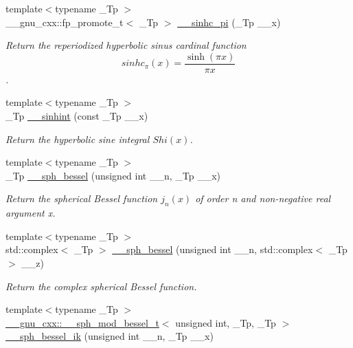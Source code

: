 \begin{DoxyCompactItemize}
{\footnotesize template$<$typename \+\_\+\+Tp $>$ }\\\+\_\+\+\_\+gnu\+\_\+cxx\+::fp\+\_\+promote\+\_\+t$<$ \+\_\+\+Tp $>$ \hyperlink{namespacestd_1_1____detail_a3478d06aa615f1efb0fd86fd4eb59195}{\+\_\+\+\_\+sinhc\+\_\+pi} (\+\_\+\+Tp \+\_\+\+\_\+x)
\begin{DoxyCompactList}\small\item\em Return the reperiodized hyperbolic sinus cardinal function \[ sinhc_\pi(x) = \frac{\sinh(\pi x)}{\pi x} \]. \end{DoxyCompactList}\item 
{\footnotesize template$<$typename \+\_\+\+Tp $>$ }\\\+\_\+\+Tp \hyperlink{namespacestd_1_1____detail_ac629f9c743a716608af2007d2e34438d}{\+\_\+\+\_\+sinhint} (const \+\_\+\+Tp \+\_\+\+\_\+x)
\begin{DoxyCompactList}\small\item\em Return the hyperbolic sine integral $ Shi(x) $. \end{DoxyCompactList}\item 
{\footnotesize template$<$typename \+\_\+\+Tp $>$ }\\\+\_\+\+Tp \hyperlink{namespacestd_1_1____detail_ac2ae8a144f79bd793e1b5d80a3b082b1}{\+\_\+\+\_\+sph\+\_\+bessel} (unsigned int \+\_\+\+\_\+n, \+\_\+\+Tp \+\_\+\+\_\+x)
\begin{DoxyCompactList}\small\item\em Return the spherical Bessel function $ j_n(x) $ of order n and non-\/negative real argument {\ttfamily x}. \end{DoxyCompactList}\item 
{\footnotesize template$<$typename \+\_\+\+Tp $>$ }\\std\+::complex$<$ \+\_\+\+Tp $>$ \hyperlink{namespacestd_1_1____detail_a28646bd01903e6da9871069a9363c593}{\+\_\+\+\_\+sph\+\_\+bessel} (unsigned int \+\_\+\+\_\+n, std\+::complex$<$ \+\_\+\+Tp $>$ \+\_\+\+\_\+z)
\begin{DoxyCompactList}\small\item\em Return the complex spherical Bessel function. \end{DoxyCompactList}\item 
{\footnotesize template$<$typename \+\_\+\+Tp $>$ }\\\hyperlink{struct____gnu__cxx_1_1____sph__mod__bessel__t}{\+\_\+\+\_\+gnu\+\_\+cxx\+::\+\_\+\+\_\+sph\+\_\+mod\+\_\+bessel\+\_\+t}$<$ unsigned int, \+\_\+\+Tp, \+\_\+\+Tp $>$ \hyperlink{namespacestd_1_1____detail_ad6abfd6ff1313354333c57e7b4c7b34c}{\+\_\+\+\_\+sph\+\_\+bessel\+\_\+ik} (unsigned int \+\_\+\+\_\+n, \+\_\+\+Tp \+\_\+\+\_\+x)

\end{DoxyCompactItemize}
